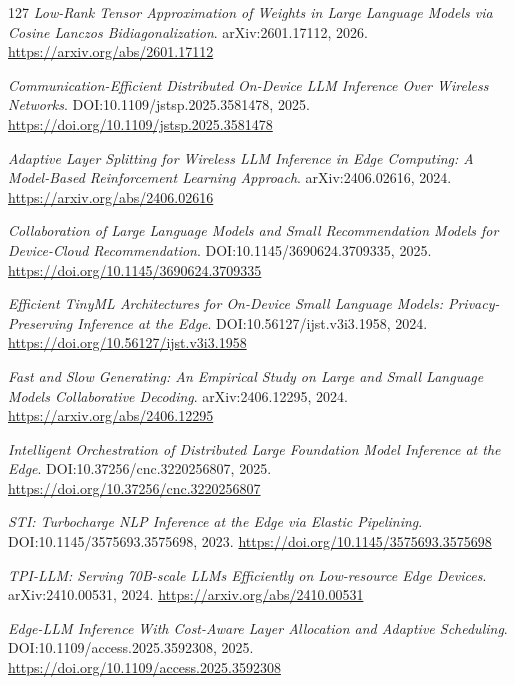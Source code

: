 \documentclass[11pt,a4paper]{article}
\begin{document}
\begin{thebibliography}{127}
\newblock \emph{Low-Rank Tensor Approximation of Weights in Large Language Models via Cosine Lanczos Bidiagonalization}.
\newblock arXiv:2601.17112, 2026.
\newblock \url{https://arxiv.org/abs/2601.17112}

\newblock \emph{Communication-Efficient Distributed On-Device LLM Inference Over Wireless Networks}.
\newblock DOI:10.1109/jstsp.2025.3581478, 2025.
\newblock \url{https://doi.org/10.1109/jstsp.2025.3581478}

\newblock \emph{Adaptive Layer Splitting for Wireless LLM Inference in Edge Computing: A Model-Based Reinforcement Learning Approach}.
\newblock arXiv:2406.02616, 2024.
\newblock \url{https://arxiv.org/abs/2406.02616}

\newblock \emph{Collaboration of Large Language Models and Small Recommendation Models for Device-Cloud Recommendation}.
\newblock DOI:10.1145/3690624.3709335, 2025.
\newblock \url{https://doi.org/10.1145/3690624.3709335}

\newblock \emph{Efficient TinyML Architectures for On-Device Small Language Models: Privacy-Preserving Inference at the Edge}.
\newblock DOI:10.56127/ijst.v3i3.1958, 2024.
\newblock \url{https://doi.org/10.56127/ijst.v3i3.1958}

\newblock \emph{Fast and Slow Generating: An Empirical Study on Large and Small Language Models Collaborative Decoding}.
\newblock arXiv:2406.12295, 2024.
\newblock \url{https://arxiv.org/abs/2406.12295}

\newblock \emph{Intelligent Orchestration of Distributed Large Foundation Model Inference at the Edge}.
\newblock DOI:10.37256/cnc.3220256807, 2025.
\newblock \url{https://doi.org/10.37256/cnc.3220256807}

\newblock \emph{STI: Turbocharge NLP Inference at the Edge via Elastic Pipelining}.
\newblock DOI:10.1145/3575693.3575698, 2023.
\newblock \url{https://doi.org/10.1145/3575693.3575698}

\newblock \emph{TPI-LLM: Serving 70B-scale LLMs Efficiently on Low-resource Edge Devices}.
\newblock arXiv:2410.00531, 2024.
\newblock \url{https://arxiv.org/abs/2410.00531}

\newblock \emph{Edge-LLM Inference With Cost-Aware Layer Allocation and Adaptive Scheduling}.
\newblock DOI:10.1109/access.2025.3592308, 2025.
\newblock \url{https://doi.org/10.1109/access.2025.3592308}


\end{thebibliography}
\end{document}
